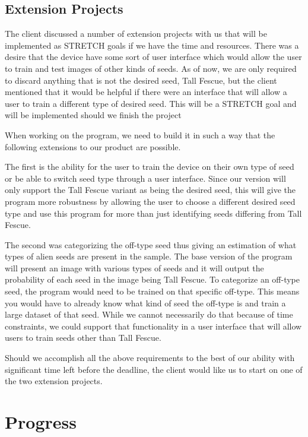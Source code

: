 \documentclass[onecolumn, draftclsnofoot,10pt, compsoc]{IEEEtran}
\begin{document}
	\subsection{Extension Projects}
	The client discussed a number of extension projects with us that will be implemented as STRETCH goals if we have the time and resources. There was a desire that the device have some sort of user interface which would allow the user to train and test images of other kinds of seeds. As of now, we are only required to discard anything that is not the desired seed, Tall Fescue, but the client mentioned that it would be helpful if there were an interface that will allow a user to train a different type of desired seed. This will be a STRETCH goal and will be implemented should we finish the project
	
	When working on the program, we need to build it in such a way that the following extensions to our product are possible.
	
	The first is the ability for the user to train the device on their own type of seed or be able to switch seed type through a user interface. Since our version will only support the Tall Fescue variant as being the desired seed, this will give the program more robustness by allowing the user to choose a different desired seed type and use this program for more than just identifying seeds differing from Tall Fescue.
	
	The second was categorizing the off-type seed thus giving an estimation of what types of alien seeds are present in the sample. The base version of the program will present an image with various types of seeds and it will output the probability of each seed in the image being Tall Fescue. To categorize an off-type seed, the program would need to be trained on that specific off-type. This means you would have to already know what kind of seed the off-type is and train a large dataset of that seed. While we cannot necessarily do that because of time constraints, we could support that functionality in a user interface that will allow users to train seeds other than Tall Fescue.   
	
	Should we accomplish all the above requirements to the best of our ability with significant time left before the deadline, the client would like us to start on one of the two extension projects.
	
	
	\section{Progress}
	
\end{document}
